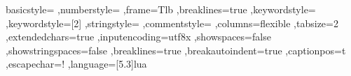 
\lstset%
{basicstyle=\ttfamily
,numberstyle=\small\ttfamily
,frame=Tlb
,breaklines=true
,keywordstyle=\color{waterblue}
,keywordstyle=[2]\color{black}
,stringstyle=\color{str}
,commentstyle=\color{gray}
,columns=flexible
,tabsize=2
,extendedchars=true
,inputencoding=utf8x
,showspaces=false
,showstringspaces=false
,breaklines=true
,breakautoindent=true
,captionpos=t
,escapechar={!}
,language={[5.3]lua}
}

